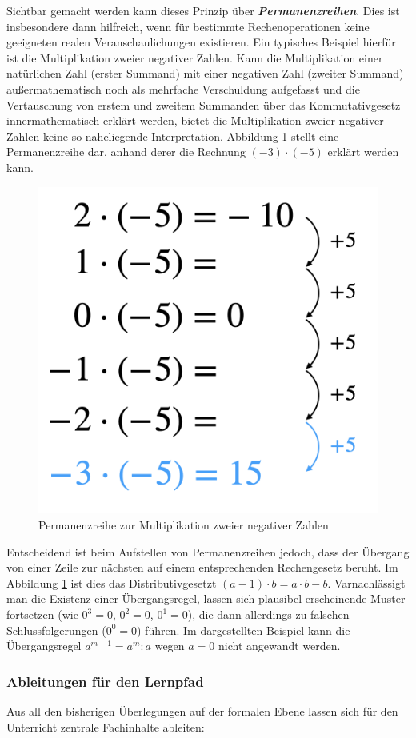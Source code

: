 \documentclass[
]{scrbook}
\theoremstyle{definition}
\theoremstyle{definition}
\theoremstyle{definition}
\theoremstyle{definition}
\theoremstyle{remark}
\begin{document}
Sichtbar gemacht werden kann dieses Prinzip über \textbf{\emph{Permanenzreihen}}. Dies ist insbesondere dann hilfreich, wenn für bestimmte Rechenoperationen keine geeigneten realen Veranschaulichungen existieren. Ein typisches Beispiel hierfür ist die Multiplikation zweier negativer Zahlen. Kann die Multiplikation einer natürlichen Zahl (erster Summand) mit einer negativen Zahl (zweiter Summand) außermathematisch noch als mehrfache Verschuldung aufgefasst und die Vertauschung von erstem und zweitem Summanden über das Kommutativgesetz innermathematisch erklärt werden, bietet die Multiplikation zweier negativer Zahlen keine so naheliegende Interpretation. Abbildung \ref{fig:Permanenz} stellt eine Permanenzreihe dar, anhand derer die Rechnung \((-3)\cdot (-5)\) erklärt werden kann.

\begin{figure}

{\centering \includegraphics[width=0.3\linewidth]{pictures/2-Permanenz} 

}

\caption{Permanenzreihe zur Multiplikation zweier negativer Zahlen}\label{fig:Permanenz}
\end{figure}

Entscheidend ist beim Aufstellen von Permanenzreihen jedoch, dass der Übergang von einer Zeile zur nächsten auf einem entsprechenden Rechengesetz beruht. Im Abbildung \ref{fig:Permanenz} ist dies das Distributivgesetzt \((a-1) \cdot b = a \cdot b - b\). Varnachlässigt man die Existenz einer Übergangsregel, lassen sich plausibel erscheinende Muster fortsetzen (wie \(0^3 = 0\), \(0^2 = 0\), \(0^1 = 0\)), die dann allerdings zu falschen Schlussfolgerungen (\(0^0 = 0\)) führen. Im dargestellten Beispiel kann die Übergangsregel \(a^{m-1} = a^m : a\) wegen \(a = 0\) nicht angewandt werden.

\subsubsection{Ableitungen für den Lernpfad}\label{ableitungen-fuxfcr-den-lernpfad}

Aus all den bisherigen Überlegungen auf der formalen Ebene lassen sich für den Unterricht zentrale Fachinhalte ableiten:
\end{document}
